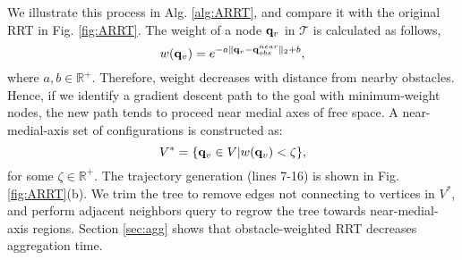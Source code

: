 We illustrate this process in Alg. \ref{alg:ARRT}, and compare it with the original RRT in Fig. \ref{fig:ARRT}. The weight of a node ${\bf q}_v$ in $\mathcal{T}$ is calculated as follows,
\begin{equation}\label{ObsDist}
	w({\bf q}_v)=e^{-a\|{\bf q}_v-{\bf q}_{obs}^{near}\|_2+b},
\end{equation}
where $a, b \in \mathbb{R}^+$. Therefore, weight decreases with distance from nearby obstacles. Hence, if we identify a gradient descent path to the goal with minimum-weight nodes, the new path tends to proceed near medial axes of free space.   
A near-medial-axis set of configurations is constructed as: 
\begin{equation}
V^*=\{{\bf q}_v\in V|w({\bf q}_v)<\zeta \},
\end{equation}
for some  $\zeta\in \mathbb{R}^+$. The trajectory generation (lines 7-16) is shown in Fig. \ref{fig:ARRT}(b). We trim the tree to remove edges not connecting to vertices in $V^*$, and perform adjacent neighbors query to regrow the tree towards near-medial-axis regions. Section \ref{sec:agg} shows that obstacle-weighted RRT decreases aggregation time. 

   










